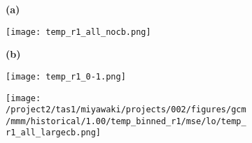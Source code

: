 \documentclass[preview]{standalone}
\begin{document}
\begin{figure}

  \begin{subfigure}[t]{0.05\textwidth}
    \textbf{\normalsize{(a)}}
  \end{subfigure}
  \begin{subfigure}[t]{0.45\textwidth}
    \texttt{[image: temp\_r1\_all\_nocb.png]}
  \end{subfigure}
  \begin{subfigure}[t]{0.05\textwidth}
    \textbf{\normalsize{(b)}}
  \end{subfigure}
  \begin{subfigure}[t]{0.45\textwidth}
    \texttt{[image: temp\_r1\_0-1.png]}
  \end{subfigure}

  \begin{subfigure}[t]{\textwidth}
    \texttt{[image: /project2/tas1/miyawaki/projects/002/figures/gcm/mmm/historical/1.00/temp\_binned\_r1/mse/lo/temp\_r1\_all\_largecb.png]}
  \end{subfigure}

\end{figure}
\end{document}
